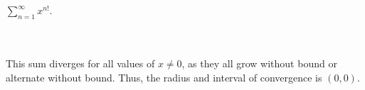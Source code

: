 $\sum_{n=1}^{\infty} x^{n!}$.\\\\

\begin{solution}\renewcommand{\qedsymbol}{}\ \\
    This sum diverges for all values of $x\neq 0$, as they all grow without bound or alternate without
    bound. Thus, the radius and interval of convergence is $(0,0)$.

\end{solution}